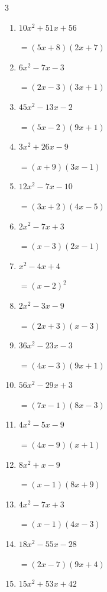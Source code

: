 \begin{multicols}{3}
\begin{enumerate}
\columnbreak %

\resetques

  \item $10x^{2}+51x+56$

        $=(5x+8)(2x+7)$

  \item $6x^{2}-7x-3$

        $=(2x-3)(3x+1)$

  \item $45x^{2}-13x-2$

        $=(5x-2)(9x+1)$

  \item $3x^{2}+26x-9$

        $=(x+9)(3x-1)$

  \item $12x^{2}-7x-10$

        $=(3x+2)(4x-5)$

  \item $2x^{2}-7x+3$

        $=(x-3)(2x-1)$

  \item $x^{2}-4x+4$

        $=(x-2)^{2}$

  \item $2x^{2}-3x-9$

        $=(2x+3)(x-3)$

  \item $36x^{2}-23x-3$

        $=(4x-3)(9x+1)$

  \item $56x^{2}-29x+3$

        $=(7x-1)(8x-3)$

\columnbreak %

  \item $4x^{2}-5x-9$

        $=(4x-9)(x+1)$

  \item $8x^{2}+x-9$

        $=(x-1)(8x+9)$

  \item $4x^{2}-7x+3$

        $=(x-1)(4x-3)$

  \item $18x^{2}-55x-28$

        $=(2x-7)(9x+4)$

  \item $15x^{2}+53x+42$


\end{enumerate}
\end{multicols}
